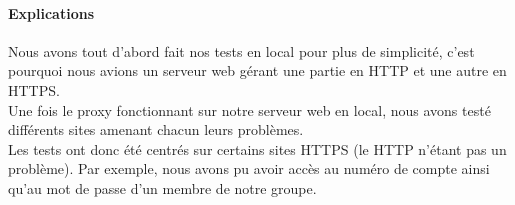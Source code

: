 \paragraph{Explications}
Nous avons tout d'abord fait nos tests en local pour plus de simplicité, c'est pourquoi nous avions un serveur web gérant une partie en HTTP et une autre en HTTPS.~~\\

Une fois le proxy fonctionnant sur notre serveur web en local, nous avons testé différents sites amenant chacun leurs problèmes.~~\\

Les tests ont donc été centrés sur certains sites HTTPS (le HTTP n'étant pas un problème).
Par exemple, nous avons pu avoir accès au numéro de compte ainsi qu'au mot de passe d'un membre de notre groupe.
